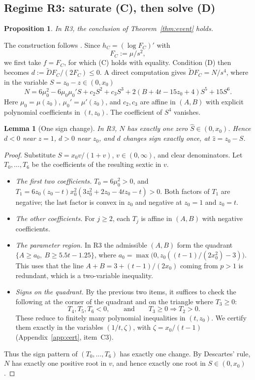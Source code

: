 \documentclass[11pt]{amsart}
\newtheorem{proposition}[theorem]{Proposition}
\newtheorem{lemma}[theorem]{Lemma}
\theoremstyle{definition}
\theoremstyle{remark}
\numberwithin{equation}{section}
\begin{document}
\subsection{Regime R3: saturate (C), then solve (D)}
\begin{proposition}\label{prop:R3}
In R3, the conclusion of Theorem~\ref{thm:event} holds.
\end{proposition}

The construction follows \cite[\S4.3.3]{Hin26}. Since $h_C=(\log F_C)'$ with
\[
F_C:=\mu/s^2,
\]
we first take $f=F_C$, for which (C) holds with equality. Condition (D) then becomes
$d:=\widetilde DF_C/(2F_C)\le0$. A direct computation gives $\widetilde DF_C=N/s^4$, where in the variable
$S=z_0-z\in(0,x_0)$
\begin{equation}\label{eq:N}
N=6\mu_0^2-6\mu_0\mu_0'S+c_2S^2+c_3S^3+2(B+4t-15z_0+4)S^5+15S^6.
\end{equation}
Here $\mu_0=\mu(z_0)$, $\mu_0'=\mu'(z_0)$, and $c_2,c_3$ are affine in $(A,B)$ with explicit polynomial
coefficients in $(t,z_0)$. The coefficient of $S^4$ vanishes.

\begin{lemma}[One sign change]\label{lem:P1}
In R3, $N$ has exactly one zero $\hat S\in(0,x_0)$. Hence $d<0$ near $z=1$, $d>0$ near $z_0$, and $d$ changes sign
exactly once, at $\hat z=z_0-\hat S$.
\end{lemma}

\begin{proof}
Substitute $S=x_0v/(1+v)$, $v\in(0,\infty)$, and clear denominators. Let $T_0,\dots,T_6$ be the coefficients of the
resulting sextic in $v$.
\begin{itemize}
\item \emph{The first two coefficients.} $T_0=6\mu_0^2>0$, and $T_1=6z_0(z_0-t)x_0^2(3z_0^2+2z_0-4tz_0-t)>0$. Both
factors of $T_1$ are negative; the last factor is convex in $z_0$ and negative at $z_0=1$ and $z_0=t$.
\item \emph{The other coefficients.} For $j\ge2$, each $T_j$ is affine in $(A,B)$ with negative coefficients.
\item \emph{The parameter region.} In R3 the admissible $(A,B)$ form the quadrant
$\{A\ge a_0,\ B\ge5.5t-1.25\}$, where $a_0=\max\big(0,z_0((t-1)/(2x_0^2)-3)\big)$. This uses that the line
$A+B=3+(t-1)/(2x_0)$ coming from $p>1$ is redundant, which is a two-variable inequality.
\item \emph{Signs on the quadrant.} By the previous two items, it suffices to check the following at the corner of
the quadrant and on the triangle where $T_3\ge0$:
\[
T_4,T_5,T_6<0,\qquad\text{and}\qquad T_3\ge0\Rightarrow T_2>0.
\]
These reduce to finitely many polynomial inequalities in $(t,z_0)$. We certify them exactly in the variables
$(1/t,\zeta)$, with $\zeta=x_0/(t-1)$ (Appendix~\ref{app:cert}, item~C3).
\end{itemize}
Thus the sign pattern of $(T_0,\dots,T_6)$ has exactly one change. By Descartes' rule, $N$ has exactly one positive
root in $v$, and hence exactly one root in $S\in(0,x_0)$.
\end{proof}
\end{document}
